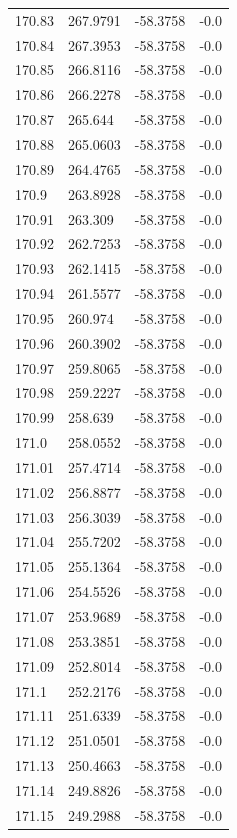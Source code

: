 \begin{table}[H]
\begin{tabular}{llll}
170.83 & 267.9791 & -58.3758 & -0.0 \\
170.84 & 267.3953 & -58.3758 & -0.0 \\
170.85 & 266.8116 & -58.3758 & -0.0 \\
170.86 & 266.2278 & -58.3758 & -0.0 \\
170.87 & 265.644 & -58.3758 & -0.0 \\
170.88 & 265.0603 & -58.3758 & -0.0 \\
170.89 & 264.4765 & -58.3758 & -0.0 \\
170.9 & 263.8928 & -58.3758 & -0.0 \\
170.91 & 263.309 & -58.3758 & -0.0 \\
170.92 & 262.7253 & -58.3758 & -0.0 \\
170.93 & 262.1415 & -58.3758 & -0.0 \\
170.94 & 261.5577 & -58.3758 & -0.0 \\
170.95 & 260.974 & -58.3758 & -0.0 \\
170.96 & 260.3902 & -58.3758 & -0.0 \\
170.97 & 259.8065 & -58.3758 & -0.0 \\
170.98 & 259.2227 & -58.3758 & -0.0 \\
170.99 & 258.639 & -58.3758 & -0.0 \\
171.0 & 258.0552 & -58.3758 & -0.0 \\
171.01 & 257.4714 & -58.3758 & -0.0 \\
171.02 & 256.8877 & -58.3758 & -0.0 \\
171.03 & 256.3039 & -58.3758 & -0.0 \\
171.04 & 255.7202 & -58.3758 & -0.0 \\
171.05 & 255.1364 & -58.3758 & -0.0 \\
171.06 & 254.5526 & -58.3758 & -0.0 \\
171.07 & 253.9689 & -58.3758 & -0.0 \\
171.08 & 253.3851 & -58.3758 & -0.0 \\
171.09 & 252.8014 & -58.3758 & -0.0 \\
171.1 & 252.2176 & -58.3758 & -0.0 \\
171.11 & 251.6339 & -58.3758 & -0.0 \\
171.12 & 251.0501 & -58.3758 & -0.0 \\
171.13 & 250.4663 & -58.3758 & -0.0 \\
171.14 & 249.8826 & -58.3758 & -0.0 \\
171.15 & 249.2988 & -58.3758 & -0.0 \\

\end{tabular}
\end{table}

